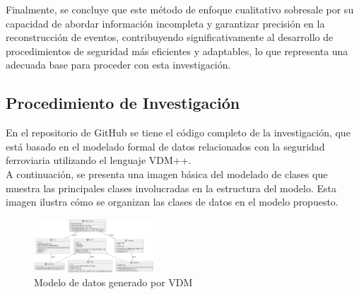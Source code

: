 \documentclass[journal]{IEEEtran}
\begin{document}
Finalmente, se concluye que este método de enfoque cualitativo sobresale por su capacidad de abordar información incompleta y garantizar precisión en la reconstrucción de eventos, contribuyendo significativamente al desarrollo de procedimientos de seguridad más eficientes y adaptables, lo que representa una adecuada base para proceder con esta investigación.  

\subsection*{Procedimiento de Investigación}  
En el repositorio de GitHub se tiene el código completo de la investigación, que está basado en el modelado formal de datos relacionados con la seguridad ferroviaria utilizando el lenguaje VDM++.\cite{rodrigostranger2023trafico_de_trenes}\\
A continuación, se presenta una imagen básica del modelado de clases que muestra las principales clases involucradas en la estructura del modelo. Esta imagen ilustra cómo se organizan las clases de datos en el modelo propuesto.  

\begin{figure}[htbp]
    \centering
    \includegraphics[width=0.4\textwidth]{img/diagrama-clases.jpg}
    \caption{Modelo de datos generado por VDM}
    \label{fig:VDM_model}
\end{figure} 


\sloppy

\end{document}
